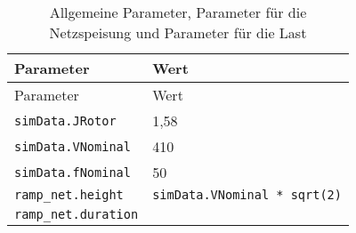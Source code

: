 \begin{longtable}[]{@{}ll@{}}
\caption{Allgemeine Parameter, Parameter für die Netzspeisung und
Parameter für die Last}\tabularnewline
\toprule
\begin{minipage}[b]{0.31\columnwidth}\raggedright
Parameter\strut
\end{minipage} & \begin{minipage}[b]{0.63\columnwidth}\raggedright
Wert\strut
\end{minipage}\tabularnewline
\midrule
\endfirsthead
\toprule
\begin{minipage}[b]{0.31\columnwidth}\raggedright
Parameter\strut
\end{minipage} & \begin{minipage}[b]{0.63\columnwidth}\raggedright
Wert\strut
\end{minipage}\tabularnewline
\midrule
\endhead
\begin{minipage}[t]{0.31\columnwidth}\raggedright
\texttt{simData.JRotor}\strut
\end{minipage} & \begin{minipage}[t]{0.63\columnwidth}\raggedright
1,58\strut
\end{minipage}\tabularnewline
\begin{minipage}[t]{0.31\columnwidth}\raggedright
\texttt{simData.VNominal}\strut
\end{minipage} & \begin{minipage}[t]{0.63\columnwidth}\raggedright
410\strut
\end{minipage}\tabularnewline
\begin{minipage}[t]{0.31\columnwidth}\raggedright
\texttt{simData.fNominal}\strut
\end{minipage} & \begin{minipage}[t]{0.63\columnwidth}\raggedright
50\strut
\end{minipage}\tabularnewline
\begin{minipage}[t]{0.31\columnwidth}\raggedright
\texttt{ramp\_net.height}\strut
\end{minipage} & \begin{minipage}[t]{0.63\columnwidth}\raggedright
\texttt{simData.VNominal\ *\ sqrt(2)}\strut
\end{minipage}\tabularnewline
\begin{minipage}[t]{0.31\columnwidth}\raggedright
\texttt{ramp\_net.duration}\strut
\end{minipage} & \begin{minipage}[t]{0.63\columnwidth}\raggedright

\end{minipage}
\end{longtable}
